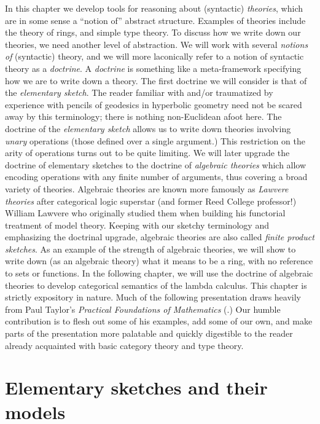 \documentclass[12pt,twoside]{reedthesis}
\theoremstyle{definition}
\theoremstyle{remark}
\theoremstyle{plain}
\begin{document}
In this chapter we develop tools for reasoning about (syntactic)
\emph{theories}, which are in some sense a ``notion of'' abstract structure.
Examples of theories include the theory of rings, and simple type theory. To
discuss how we write down our theories, we need another level of abstraction. We
will work with several \emph{notions of} (syntactic) theory, and we will more
laconically refer to a notion of syntactic theory as a \emph{doctrine}. A
\emph{doctrine} is something like a meta-framework specifying how we are to
write down a theory. The first doctrine we will consider is that of the
\emph{elementary sketch}. The reader familiar with and/or traumatized by
experience with pencils of geodesics in hyperbolic geometry need not be scared
away by this terminology; there is nothing non-Euclidean afoot here. The
doctrine of the \emph{elementary sketch} allows us to write down theories
involving \emph{unary} operations (those defined over a single argument.) This
restriction on the arity of operations turns out to be quite limiting. We will
later upgrade the doctrine of elementary sketches to the doctrine of
\emph{algebraic theories} which allow encoding operations with any finite number
of arguments, thus covering a broad variety of theories. Algebraic theories are
known more famously as \emph{Lawvere theories} after categorical logic superstar
(and former Reed College professor!) William Lawvere who originally studied them
when building his functorial treatment of model theory. Keeping with our sketchy
terminology and emphasizing the doctrinal upgrade, algebraic theories are also
called \emph{finite product sketches}. As an example of the strength of
algebraic theories, we will show to write down (as an algebraic theory) what it
means to be a ring, with no reference to sets or functions. In the following
chapter, we will use the doctrine of algebraic theories to develop categorical
semantics of the lambda calculus. This chapter is strictly expository in nature.
Much of the following presentation draws heavily from Paul Taylor's
\emph{Practical Foundations of Mathematics} (\cite{taylor_practical_1999}.) Our
humble contribution is to flesh out some of his examples, add some of our own,
and make parts of the presentation more palatable and quickly digestible to the
reader already acquainted with basic category theory and type theory.

\section{Elementary sketches and their models}
\end{document}
